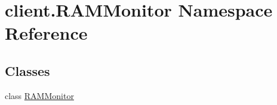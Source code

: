 \hypertarget{namespaceclient_1_1_r_a_m_monitor}{\section{client.\-R\-A\-M\-Monitor Namespace Reference}
\label{namespaceclient_1_1_r_a_m_monitor}
}
\subsection*{Classes}
\begin{DoxyCompactItemize}
\item 
class \hyperlink{classclient_1_1_r_a_m_monitor_1_1_r_a_m_monitor}{R\-A\-M\-Monitor}
\end{DoxyCompactItemize}
